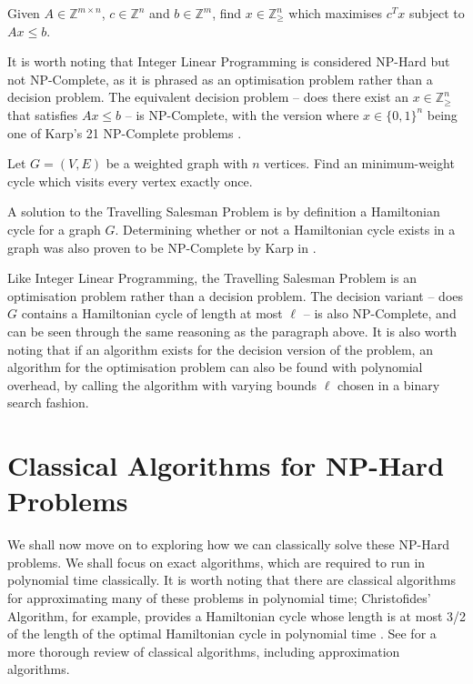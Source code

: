 \begin{problem}
Given $A \in \mathbb{Z}^{m\times n}$, $c \in \mathbb{Z}^n$ and $b \in \mathbb{Z}^m$, find $x\in\mathbb{Z}_\geq^n$ which maximises $c^Tx$ subject to $Ax \leq b$.
\end{problem}

It is worth noting that Integer Linear Programming is considered NP-Hard but not NP-Complete, as it is phrased as an optimisation problem rather than a decision problem. The equivalent decision problem -- does there exist an $x \in \mathbb{Z}_\geq^n$ that satisfies $Ax \leq b$ -- is NP-Complete, with the version where $x\in\{0,1\}^n$ being one of Karp's 21 NP-Complete problems \cite{karp1972}.

\begin{problem}
Let $G = (V,E)$ be a weighted graph with $n$ vertices. Find an minimum-weight cycle which visits every vertex exactly once.
\end{problem}

A solution to the Travelling Salesman Problem is by definition a Hamiltonian cycle for a graph $G$. Determining whether or not a Hamiltonian cycle exists in a graph was also proven to be NP-Complete by Karp in \cite{karp1972}.

Like Integer Linear Programming, the Travelling Salesman Problem is an optimisation problem rather than a decision problem. The decision variant -- does $G$ contains a Hamiltonian cycle of length at most $\ell$ -- is also NP-Complete, and can be seen through the same reasoning as the paragraph above. It is also worth noting that if an algorithm exists for the decision version of the problem, an algorithm for the optimisation problem can also be found with polynomial overhead, by calling the algorithm with varying bounds $\ell$ chosen in a binary search fashion.

\section{Classical Algorithms for NP-Hard Problems}
\label{sec:classical-np}

We shall now move on to exploring how we can classically solve these NP-Hard problems. We shall focus on exact algorithms, which are required to run in polynomial time classically. It is worth noting that there are classical algorithms for approximating many of these problems in polynomial time; Christofides' Algorithm, for example, provides a Hamiltonian cycle whose length is at most 3/2 of the length of the optimal Hamiltonian cycle in polynomial time \cite{christofides1976}. See \cite{garey1979} for a more thorough review of classical algorithms, including approximation algorithms.


